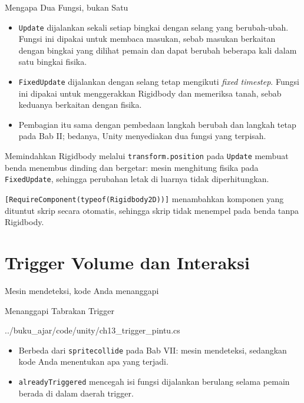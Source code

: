 \documentclass[aspectratio=169,10pt]{beamer}
\begin{document}
\begin{frame}{Mengapa Dua Fungsi, bukan Satu}
\begin{itemize}
  \item \texttt{Update} dijalankan sekali setiap bingkai dengan selang yang
        berubah-ubah. Fungsi ini dipakai untuk membaca masukan, sebab masukan
        berkaitan dengan bingkai yang dilihat pemain dan dapat berubah beberapa
        kali dalam satu bingkai fisika.
  \item \texttt{FixedUpdate} dijalankan dengan selang tetap mengikuti
        \emph{fixed timestep}. Fungsi ini dipakai untuk menggerakkan Rigidbody
        dan memeriksa tanah, sebab keduanya berkaitan dengan fisika.
  \item Pembagian itu sama dengan pembedaan langkah berubah dan langkah tetap
        pada Bab II; bedanya, Unity menyediakan dua fungsi yang terpisah.
\end{itemize}
\begin{peringatan}
Memindahkan Rigidbody melalui \texttt{transform.position} pada \texttt{Update}
membuat benda menembus dinding dan bergetar: mesin menghitung fisika pada
\texttt{FixedUpdate}, sehingga perubahan letak di luarnya tidak diperhitungkan.
\end{peringatan}
\begin{kotak}
\texttt{[RequireComponent(typeof(Rigidbody2D))]} menambahkan komponen yang
dituntut skrip secara otomatis, sehingga skrip tidak menempel pada benda tanpa
Rigidbody.
\end{kotak}
\end{frame}

\section{Trigger Volume dan Interaksi}
  {Mesin mendeteksi, kode Anda menanggapi}

\begin{frame}[fragile]{Menanggapi Tabrakan Trigger}

  {../buku_ajar/code/unity/ch13_trigger_pintu.cs}
\begin{itemize}
  \item Berbeda dari \texttt{spritecollide} pada Bab VII: mesin mendeteksi,
        sedangkan kode Anda menentukan apa yang terjadi.
  \item \texttt{alreadyTriggered} mencegah isi fungsi dijalankan berulang
        selama pemain berada di dalam daerah trigger.
\end{itemize}
\end{frame}
\end{document}
